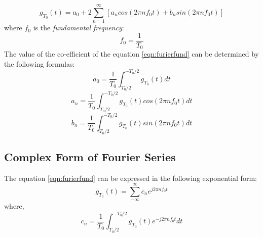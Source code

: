 \documentclass{report}
\begin{document}
\begin{equation}
 g_{T_0}(t) = a_{0} + 2\sum_{n=1}^{\infty} [ a_n cos(2 \pi nf_{0}t) + b_n sin(2 \pi nf_{0}t) ]
 \label{eqn:furierfund}
\end{equation}
where $ f_{0} $ is the \textit{fundamental frequency}:
\begin{equation}
f_{0}=\frac{1}{T_{0}}
\label{eqn:fundfreq}
\end{equation}
The value of the co-efficient of the equation \ref{eqn:furierfund} can be determined by the following formulas:
\begin{equation}
a_{0} =  \frac{1}{T_{0}}\int_{T_{0}/2}^{-T_{0}/2} g_{T_0}(t) dt
\end{equation}
\begin{equation}
a_{n} =  \frac{1}{T_{0}}\int_{T_{0}/2}^{-T_{0}/2} g_{T_0}(t)cos(2 \pi nf_{0}t) dt
\end{equation}
\begin{equation}
b_{n} =  \frac{1}{T_{0}}\int_{T_{0}/2}^{-T_{0}/2} g_{T_0}(t)sin(2 \pi nf_{0}t) dt
\end{equation}
\subsection{Complex Form of Fourier Series}
The equation \ref{eqn:furierfund} can be expressed in the following  exponential form:
\begin{equation}
g_{T_0}(t) =\sum_{-\infty}^{\infty} c_{n} e^{\textit{j}2\pi nf_{0} t}
\end{equation}
where,
\begin{equation}
c_{n}= \frac{1}{T_{0}}\int_{T_{0}/2}^{-T_{0}/2} g_{T_0}(t)e^{-\textit{j}2\pi nf_{0} t} dt
\end{equation}
\end{document}
